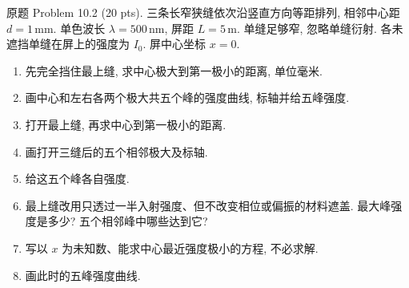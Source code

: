 \begin{exercise}\label{ps:10.2}
原题 Problem 10.2 (20 pts). 三条长窄狭缝依次沿竖直方向等距排列, 相邻中心距 $d=1\,\mathrm{mm}$. 单色波长 $\lambda=500\,\mathrm{nm}$, 屏距 $L=5\,\mathrm m$. 单缝足够窄, 忽略单缝衍射. 各未遮挡单缝在屏上的强度为 $I_0$. 屏中心坐标 $x=0$.
\begin{enumerate}[label=\alph*.]
\item 先完全挡住最上缝, 求中心极大到第一极小的距离, 单位毫米.
\item 画中心和左右各两个极大共五个峰的强度曲线, 标轴并给五峰强度.
\item 打开最上缝, 再求中心到第一极小的距离.
\item 画打开三缝后的五个相邻极大及标轴.
\item 给这五个峰各自强度.
\item 最上缝改用只透过一半入射强度、但不改变相位或偏振的材料遮盖. 最大峰强度是多少? 五个相邻峰中哪些达到它?
\item 写以 $x$ 为未知数、能求中心最近强度极小的方程, 不必求解.
\item 画此时的五峰强度曲线.
\end{enumerate}
\end{exercise}
